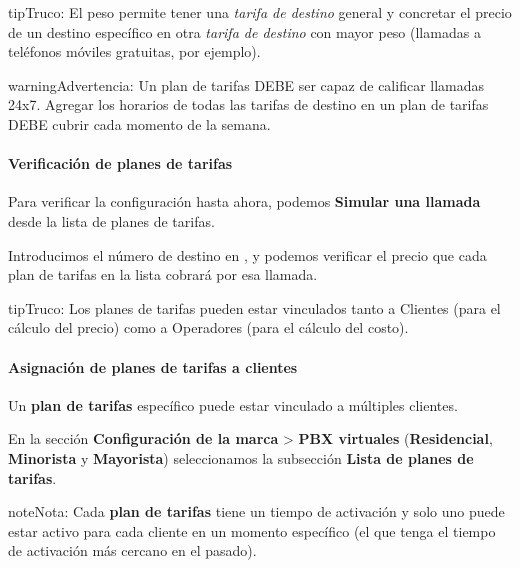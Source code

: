 \documentclass[letterpaper,10pt,spanish]{sphinxmanual}
\begin{document}
\begin{notice}{tip}{Truco:}
El peso permite tener una \emph{tarifa de destino} general y concretar el precio de un destino específico en otra \emph{tarifa de destino} con mayor peso (llamadas a teléfonos móviles gratuitas, por ejemplo).
\end{notice}

\begin{notice}{warning}{Advertencia:}
Un plan de tarifas DEBE ser capaz de calificar llamadas 24x7. Agregar los horarios de todas las tarifas de destino en un plan de tarifas DEBE cubrir cada momento de la semana.
\end{notice}
\paragraph{Verificación de planes de tarifas}

Para verificar la configuración hasta ahora, podemos \textbf{Simular una llamada} desde la lista de planes de tarifas.

Introducimos el número de destino en {\hyperref[administration_portal/brand/settings/numeric_transformations:e164]{}}, y podemos verificar el precio que cada plan de tarifas en la lista cobrará por esa llamada.

\begin{notice}{tip}{Truco:}
Los planes de tarifas pueden estar vinculados tanto a Clientes (para el cálculo del precio) como a Operadores (para el cálculo del costo).
\end{notice}


\paragraph{Asignación de planes de tarifas a clientes}
\label{administration_portal/brand/billing/rating_plans:id2}\label{administration_portal/brand/billing/rating_plans:assigning-rating-plans-to-clients}
Un \textbf{plan de tarifas} específico puede estar vinculado a múltiples clientes.

En la sección \textbf{Configuración de la marca} \textgreater{} \textbf{PBX virtuales} (\textbf{Residencial}, \textbf{Minorista} y \textbf{Mayorista}) seleccionamos la subsección \textbf{Lista de planes de tarifas}.

\begin{notice}{note}{Nota:}
Cada \textbf{plan de tarifas} tiene un tiempo de activación y solo uno puede estar activo para cada cliente en un momento específico (el que tenga el tiempo de activación más cercano en el pasado).
\end{notice}
\end{document}
